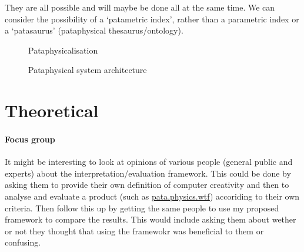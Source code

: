 

They are all possible and will maybe be done all at the same time. We can consider the possibility of a `patametric index', rather than a parametric index or a `patasaurus' (pataphysical thesaurus/ontology).

\begin{figure}[!htbp] %
  \centering
  \def\svgwidth{\columnwidth}
  
\caption[Pataphysicalisation]{Pataphysicalisation}
\label{fig:patasearch02f}
\end{figure}
\begin{figure}[!htbp]
  \centering
  \caption[Pataphysical system architecture]{Pataphysical system architecture}
  \label{fig:patarc}
\end{figure}



\section{Theoretical}

\paragraph{Focus group}
It might be interesting to look at opinions of various people (general public and experts) about the interpretation/evaluation framework. This could be done by asking them to provide their own definition of computer creativity and then to analyse and evaluate a product (such as \url{pata.physics.wtf}) accoriding to their own criteria. Then follow this up by getting the same people to use my proposed framework to compare the results. This would include asking them about wether or not they thought that using the framewokr was beneficial to them or confusing.


